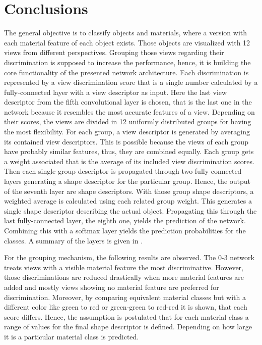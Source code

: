 \section{Conclusions}
\label{sec:discussion-conclusion}
The general objective is to classify objects and materials, where a version with each material feature of each object exists.
Those objects are visualized with 12 views from different perspectives.
Grouping those views regarding their discrimination is supposed to increase the performance, hence, it is building the core functionality of the presented network architecture.
Each discrimination is represented by a view discrimination score that is a single number calculated by a fully-connected layer with a view descriptor as input.
Here the last view descriptor from the fifth convolutional layer is chosen, that is the last one in the network because it resembles the most accurate features of a view.
Depending on their scores, the views are divided in 12 uniformly distributed groups for having the most flexibility.
For each group, a view descriptor is generated by averaging its contained view descriptors.
This is possible because the views of each group have probably similar features, thus, they are combined equally.
Each group gets a weight associated that is the average of its included view discrimination scores.
Then each single group descriptor is propagated through two fully-connected layers generating a shape descriptor for the particular group.
Hence, the output of the seventh layer are shape descriptors.
With those group shape descriptors, a weighted average is calculated using each related group weight.
This generates a single shape descriptor describing the actual object.
Propagating this through the last fully-connected layer, the eighth one, yields the prediction of the network.
Combining this with a softmax layer yields the prediction probabilities for the classes.
A summary of the layers is given in .

For the grouping mechanism, the following results are observed.
The 0-3 network treats views with a visible material feature the most discriminative.
However, those discriminations are reduced drastically when more material features are added and mostly views showing no material feature are preferred for discrimination.
Moreover, by comparing equivalent material classes but with a different color like green to red or green-green to red-red it is shown, that each score differs.
Hence, the assumption is postulated that for each material class a range of values for the final shape descriptor is defined.
Depending on how large it is a particular material class is predicted.

